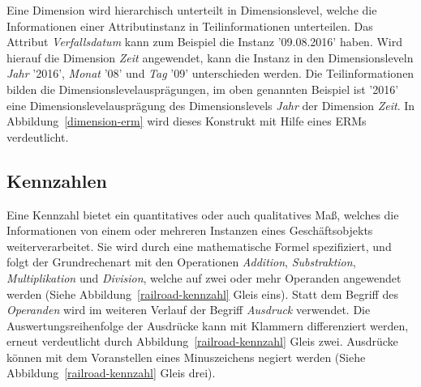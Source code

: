 \documentclass[
  language=german, %
  type=bachelor%
]{isthesis}
\begin{document}
\begin{content}
  Eine Dimension wird hierarchisch unterteilt in Dimensionslevel, welche die
  Informationen einer Attributinstanz in Teilinformationen unterteilen. Das
  Attribut \textit{Verfallsdatum} kann zum Beispiel die Instanz '09.08.2016'
  haben. Wird hierauf die Dimension \textit{Zeit} angewendet, kann die Instanz
  in den Dimensionsleveln \textit{Jahr} '2016', \textit{Monat} '08' und
  \textit{Tag} '09' unterschieden werden. Die Teilinformationen bilden die
  Dimensionslevelausprägungen, im oben genannten Beispiel ist '2016' eine
  Dimensionslevelausprägung des Dimensionslevels \textit{Jahr} der Dimension
  \textit{Zeit}. In Abbildung~\ref{dimension-erm} wird dieses Konstrukt mit
  Hilfe eines \acrshort{ERM}s verdeutlicht.
  
  \subsection{Kennzahlen}

  \begin{figure}[caption={Teilsprache---Kennzahl}, label={kennzahl}]
    \resizebox{250px}{!}{}
  \end{figure}

  Eine Kennzahl bietet ein quantitatives oder auch qualitatives Maß,
  welches die Informationen von einem oder mehreren Instanzen eines
  Geschäftsobjekts weiterverarbeitet. Sie wird durch eine mathematische Formel
  spezifiziert, und folgt der Grundrechenart mit den Operationen
  \textit{Addition}, \textit{Substraktion}, \textit{Multiplikation} und
  \textit{Division}, welche auf zwei oder mehr Operanden angewendet werden
  (Siehe Abbildung~\ref{railroad-kennzahl} Gleis eins).  Statt dem Begriff des
  \textit{Operanden} wird im weiteren Verlauf der Begriff \textit{Ausdruck}
  verwendet.  Die Auswertungsreihenfolge der Ausdrücke kann mit Klammern
  differenziert werden, erneut verdeutlicht durch
  Abbildung~\ref{railroad-kennzahl} Gleis zwei. Ausdrücke können mit dem
  Voranstellen eines Minuszeichens negiert werden (Siehe
  Abbildung~\ref{railroad-kennzahl} Gleis drei).



\end{content}
\end{document}

